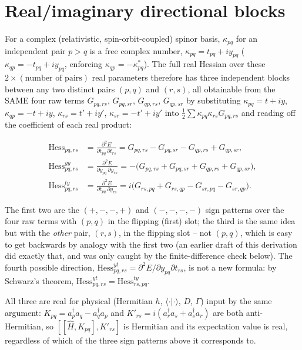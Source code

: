 \documentclass[11pt]{article}
\newcommand{\ccr}[1]{a_{#1}^{\dagger}}
\newcommand{\ann}[1]{a_{#1}}
\begin{document}
\section*{Real/imaginary directional blocks}

For a complex (relativistic, spin-orbit-coupled) spinor basis, $\kappa_{pq}$
for an independent pair $p>q$ is a free complex number, $\kappa_{pq}=t_{pq}+iy_{pq}$
($\kappa_{qp}=-t_{pq}+iy_{pq}$, enforcing $\kappa_{qp}=-\kappa_{pq}^{*}$). The full
real Hessian over these $2\times(\text{number of pairs})$ real parameters therefore
has three independent blocks between any two distinct pairs $(p,q)$ and $(r,s)$, all
obtainable from the SAME four raw terms $G_{pq,rs}$, $G_{pq,sr}$, $G_{qp,rs}$,
$G_{qp,sr}$ by substituting $\kappa_{pq}=t+iy$, $\kappa_{qp}=-t+iy$,
$\kappa_{rs}=t'+iy'$, $\kappa_{sr}=-t'+iy'$ into
$\tfrac12\sum\kappa_{pq}\kappa_{rs}G_{pq,rs}$ and reading off the coefficient of
each real product:

\begin{align}
\text{Hess}_{pq,rs} &= \frac{\partial^2 E}{\partial t_{pq}\,\partial t_{rs}}
= G_{pq,rs} - G_{pq,sr} - G_{qp,rs} + G_{qp,sr}, \label{eq:hess-real} \\[4pt]
\text{Hess}^{yy}_{pq,rs} &= \frac{\partial^2 E}{\partial y_{pq}\,\partial y_{rs}}
= -\big(G_{pq,rs} + G_{pq,sr} + G_{qp,rs} + G_{qp,sr}\big), \\[4pt]
\text{Hess}^{ty}_{pq,rs} &= \frac{\partial^2 E}{\partial t_{pq}\,\partial y_{rs}}
= i\big(G_{rs,pq} + G_{rs,qp} - G_{sr,pq} - G_{sr,qp}\big).
\end{align}

The first two are the $(+,-,-,+)$ and $(-,-,-,-)$ sign patterns over the four raw
terms with $(p,q)$ in the flipping (first) slot; the third is the same idea but
with the \emph{other} pair, $(r,s)$, in the flipping slot -- not $(p,q)$, which is
easy to get backwards by analogy with the first two (an earlier draft of this
derivation did exactly that, and was only caught by the finite-difference check
below). The fourth possible direction, $\text{Hess}^{yt}_{pq,rs}=\partial^2E/\partial
y_{pq}\partial t_{rs}$, is not a new formula: by Schwarz's theorem,
$\text{Hess}^{yt}_{pq,rs}=\text{Hess}^{ty}_{rs,pq}$.

All three are real for physical (Hermitian $h$, $\langle\cdot|\cdot\rangle$, $D$,
$\Gamma$) input by the same argument: $K_{pq}=\ccr{p}\ann{q}-\ccr{q}\ann{p}$ and
$K'_{rs}=i(\ccr{r}\ann{s}+\ccr{s}\ann{r})$ are both anti-Hermitian, so
$[[\hat H,K_{pq}],K'_{rs}]$ is Hermitian and its expectation value is real,
regardless of which of the three sign patterns above it corresponds to.
\end{document}
